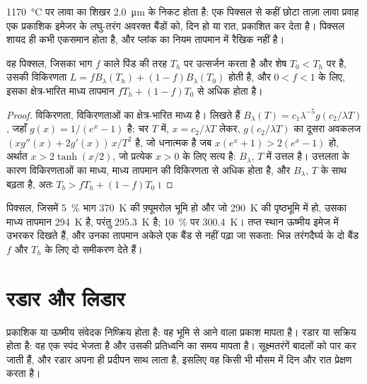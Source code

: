 \qty{1170}{\celsius} पर लावा का शिखर \qty{2.0}{\micro\metre} के निकट होता है: एक
पिक्सल से कहीं छोटा ताज़ा लावा प्रवाह एक प्रकाशिक इमेजर के लघु-तरंग अवरक्त
बैंडों को, दिन हो या रात, प्रकाशित कर देता है। पिक्सल शायद ही कभी एकसमान होता है, और
प्लांक का नियम तापमान में रैखिक नहीं है।

\begin{proposition}[मिश्रित पिक्सल]\label{prop:b3:remote-sensing-gis:mixed}
वह पिक्सल, जिसका भाग $f$ काले पिंड की तरह $T_h$ पर उत्सर्जन करता है और शेष
$T_0 < T_h$ पर है, उसकी विकिरणता $L = fB_\lambda(T_h) + (1 - f)B_\lambda(T_0)$ होती है,
और $0 < f < 1$ के लिए, इसका  क्षेत्र-भारित
माध्य तापमान $fT_h + (1 - f)T_0$ से अधिक होता है।
\end{proposition}

\begin{proof}
विकिरणता, विकिरणताओं का क्षेत्र-भारित माध्य है। लिखते हैं $B_\lambda(T)
= c_1\lambda^{-5}g(c_2/\lambda T)$, जहाँ $g(x) = 1/(e^x - 1)$ है; चर $T$ में,
$x = c_2/\lambda T$ लेकर, $g(c_2/\lambda T)$ का दूसरा अवकलज
$(x g''(x) + 2g'(x))\,x/T^2$ है, जो धनात्मक है जब $x(e^x + 1)
> 2(e^x - 1)$ हो, अर्थात $x > 2\tanh(x/2)$, जो प्रत्येक $x > 0$ के लिए सत्य है:
$B_\lambda$, $T$ में उत्तल है। उत्तलता के कारण
विकिरणताओं का माध्य, माध्य तापमान की विकिरणता से अधिक होता है, और
$B_\lambda$, $T$ के साथ बढ़ता है, अतः $T_b > fT_h + (1 - f)T_0$।
\end{proof}

पिक्सल, जिसमें \qty{5}{\percent} भाग \qty{370}{K} की फ़्यूमरोल भूमि
हो और जो \qty{290}{K} की पृष्ठभूमि में हो, उसका माध्य तापमान
\qty{294}{K} है, परंतु  \qty{295.3}{K} है;
\qty{10}{\percent} पर \qty{300.4}{K}। तप्त स्थान ऊष्मीय इमेज में उभरकर दिखते हैं, और उनका
तापमान अकेले एक बैंड से नहीं पढ़ा जा सकता: भिन्न तरंगदैर्घ्य के दो बैंड
$f$ और $T_h$ के लिए दो समीकरण देते हैं।

\section{रडार और लिडार}\label{sec:b3:remote-sensing-gis:radar}

प्रकाशिक या ऊष्मीय संवेदक निष्क्रिय होता है: वह भूमि से आने वाला
प्रकाश मापता है। रडार या  सक्रिय होता है: वह एक स्पंद भेजता है और उसकी प्रतिध्वनि का समय मापता है।
सूक्ष्मतरंगें बादलों को पार कर जाती हैं, और रडार अपना ही प्रदीपन साथ लाता है,
इसलिए वह किसी भी मौसम में दिन और रात प्रेक्षण करता है।

